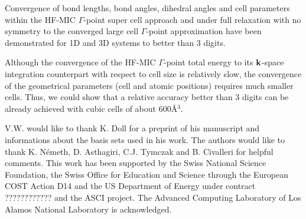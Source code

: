 \documentclass[prl,twocolumn,showpacs,twocolumngrid,superbib]{revtex4}
\begin{document}
Convergence of bond lengths, bond angles, 
dihedral angles and cell parameters within the HF-MIC $\Gamma$-point
super cell approach and under full relaxation with no symmetry 
to the converged large cell $\Gamma$-point approximation have
been demonstrated for 1D and 3D systems to better than 3 digits.

Although the convergence of the HF-MIC $\Gamma$-point total energy to 
its ${\bf k}$-space integration counterpart with respect to cell size is relatively slow,
the convergence of the geometrical parameters (cell and atomic positions)
requires much smaller cells. Thus, we could show that a relative accuracy better
than 3 digits can be already achieved with cubic cells of about $600$\AA$^3$.
\\
\begin{acknowledgments}
 V.W. would like to thank K. Doll for a preprint of his manuscript and informations
 about the basis sets used in his work.
 The authors would like to thank K. N\'emeth, D. Asthagiri, C.J. Tymczak 
 and B. Civalleri for helpful comments.
 This work has been supported by the Swiss National Science Foundation, 
 the Swiss Office for Education and Science through the European 
 COST Action D14 and the US Department of Energy 
 under contract ???????????? and the ASCI project.  
 The Advanced Computing Laboratory of Los 
 Alamos National Laboratory is acknowledged.
\end{acknowledgments}  

\end{document}
